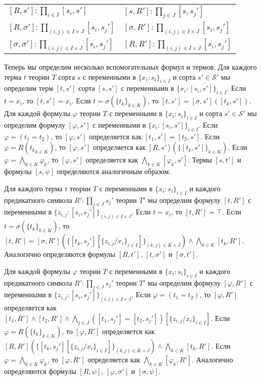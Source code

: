 \documentclass[reqno]{amsart}
\theoremstyle{definition}
\theoremstyle{remark}
\begin{document}
\begin{tabular}{ l l }
  $[R,s'] : \prod_{i \in I} [s_i,s']$ & $[s,R'] : \prod_{j \in J} [s,s_j']$ \\
  $[R,\sigma'] : \prod_{(i,j) \in I \times J} [s_i,s_j']$ & $[\sigma,R'] : \prod_{(i,j) \in I \times J} [s_i,s_j']$ \\
  $[\sigma,\sigma'] : \prod_{(i,j) \in I \times J} [s_i,s_j']$ & $[R,R'] : \prod_{(i,j) \in I \times J} [s_i,s_j']$ \\
\end{tabular}

Теперь мы определим несколько вспомогательных формул и термов.
Для каждого терма $t$ теории $T$ сорта $s$ с переменными в $\{ x_i : s_i \}_{i \in I}$ и сорта $s' \in \mathcal{S}'$ мы определим терм $[t,s']$ сорта $[s,s']$ с переменными в $\{ x_i : [s_i,s'] \}_{i \in I}$.
Если $t = x_i$, то $[t,s'] = x_i$.
Если $t = \sigma(\{ t_k \}_{k \in K})$, то $[t,s'] = [\sigma,s']([t_k,s'])$.
Для каждой формулы $\varphi$ теории $T$ с переменными в $\{ x_i : s_i \}_{i \in I}$ и сорта $s' \in \mathcal{S}'$ мы определим формулу $[\varphi,s']$ с переменными в $\{ x_i : [s_i,s'] \}_{i \in I}$.
Если $\varphi = (t_1 = t_2)$, то $[\varphi,s']$ определяется как $[t_1,s'] = [t_2,s']$.
Если $\varphi = R({ t_k }_{k \in K})$, то $[\varphi,s']$ определяется как $[R,s'](\{ [t_k,s'] \}_{k \in K})$.
Если $\varphi = \bigwedge_{k \in K} \varphi_k$, то $[\varphi,s']$ определяется как $\bigwedge_{k \in K} [\varphi_k,s']$.
Термы $[s,t']$ и формулы $[s,\psi]$ определяются аналогичным образом.

Для каждого терма $t$ теории $T$ с переменными в $\{ x_i : s_i \}_{i \in I}$ и каждого предикатного символа $R' : \prod_{j \in J} s_j'$ теории $T'$
мы определим формулу $[t,R']$ с переменными в $\{ z_{i,j} : [s_i,s_j'] \}_{(i,j) \in I \times J}$.
Если $t = x_i$, то $[t,R'] = \top$.
Если $t = \sigma(\{ t_k \}_{k \in K})$, то $[t,R'] = [\sigma,R'](\{ [t_k,s_j'][\{ z_{i,j}/x_i \}_{i \in I}] \}_{(k,j) \in K \times J}) \land \bigwedge_{k \in K} [t_k,R']$.
Аналогично определяются формулы $[R,t']$, $[t,\sigma']$ и $[\sigma,t']$.

Для каждой формулы $\varphi$ теории $T$ с переменными в $\{ x_i : s_i \}_{i \in I}$ и каждого предикатного символа $R' : \prod_{j \in J} s_j'$ теории $T'$
мы определим формулу $[\varphi,R']$ с переменными в $\{ z_{i,j} : [s_i,s_j'] \}_{(i,j) \in I \times J}$.
Если $\varphi = (t_1 = t_2)$, то $[\varphi,R']$ определяется как $[t_1,R'] \land [t_2,R'] \land \bigwedge_{j \in J} ([t_1,s_j'] = [t_2,s_j'])[\{ z_{i,j}/x_i \}_{i \in I}]$.
Если $\varphi = R(\{ t_k \}_{k \in K})$, то $[\varphi,R']$ определяется как $[R,R'](\{ [t_k,s_j'][\{ z_{i,j}/x_i \}_{i \in I}] \}_{(k,j) \in K \times J}) \land \bigwedge_{k \in K} [t_k,R']$.
Если $\varphi = \bigwedge_{k \in K} \varphi_k$, то $[\varphi,R']$ определяется как $\bigwedge_{k \in K} [\varphi_k,R']$.
Аналогично определяются формулы $[R,\psi]$, $[\varphi,\sigma']$ и $[\sigma,\psi]$.
\end{document}
